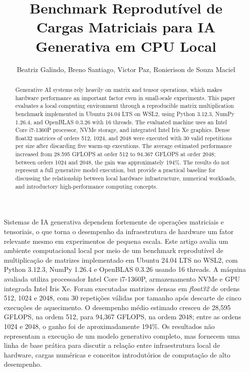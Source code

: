 \documentclass[12pt]{article}
\title{Benchmark Reprodutível de Cargas Matriciais para IA Generativa em CPU Local}
\author{Beatriz Galindo\inst{1}, Breno Santiago\inst{1}, Victor Paz\inst{1}, Ronierison de Souza Maciel\inst{1}}
\begin{document}
\maketitle

\begin{abstract}
Generative AI systems rely heavily on matrix and tensor operations, which makes hardware performance an important factor even in small-scale experiments. This paper evaluates a local computing environment through a reproducible matrix multiplication benchmark implemented in Ubuntu 24.04 LTS on WSL2, using Python 3.12.3, NumPy 1.26.4, and OpenBLAS 0.3.26 with 16 threads. The evaluated machine uses an Intel Core i7-1360P processor, NVMe storage, and integrated Intel Iris Xe graphics. Dense float32 matrices of orders 512, 1024, and 2048 were executed with 30 valid repetitions per size after discarding five warm-up executions. The average estimated performance increased from 28.595 GFLOPS at order 512 to 94.367 GFLOPS at order 2048; between orders 1024 and 2048, the gain was approximately 194\%. The results do not represent a full generative model execution, but provide a practical baseline for discussing the relationship between local hardware infrastructure, numerical workloads, and introductory high-performance computing concepts.
\end{abstract}

\begin{resumo}
Sistemas de IA generativa dependem fortemente de operações matriciais e tensoriais, o que torna o desempenho da infraestrutura de hardware um fator relevante mesmo em experimentos de pequena escala. Este artigo avalia um ambiente computacional local por meio de um benchmark reprodutível de multiplicação de matrizes implementado em Ubuntu 24.04 LTS no WSL2, com Python 3.12.3, NumPy 1.26.4 e OpenBLAS 0.3.26 usando 16 threads. A máquina avaliada utiliza processador Intel Core i7-1360P, armazenamento NVMe e GPU integrada Intel Iris Xe. Foram executadas matrizes densas em \textit{float32} de ordens 512, 1024 e 2048, com 30 repetições válidas por tamanho após descarte de cinco execuções de aquecimento. O desempenho médio estimado cresceu de 28,595 GFLOPS, na ordem 512, para 94,367 GFLOPS, na ordem 2048; entre as ordens 1024 e 2048, o ganho foi de aproximadamente 194\%. Os resultados não representam a execução de um modelo generativo completo, mas fornecem uma linha de base prática para discutir a relação entre infraestrutura local de hardware, cargas numéricas e conceitos introdutórios de computação de alto desempenho.
\end{resumo}
\end{document}
